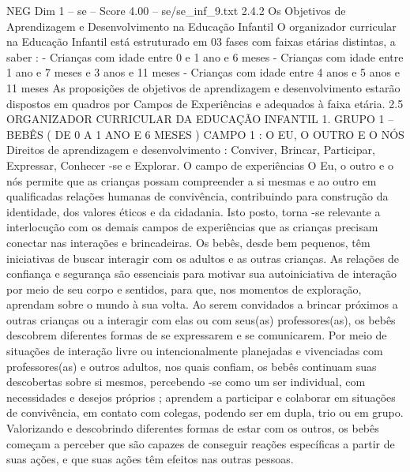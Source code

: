 \begin{textsample}{NEG Dim 1 – se – Score 4.00 – se/se\_inf\_9.txt}  \label{ex:f1_neg_202}
2.4.2 Os Objetivos de Aprendizagem e Desenvolvimento na Educação Infantil O organizador curricular na Educação Infantil está estruturado em 03 fases com faixas etárias distintas, a saber : - Crianças com idade entre 0 e 1 ano e 6 meses - Crianças com idade entre 1 ano e 7 meses e 3 anos e 11 meses - Crianças com idade entre 4 anos e 5 anos e 11 meses As proposições de objetivos de aprendizagem e desenvolvimento estarão dispostos em quadros por Campos de Experiências e adequados à faixa etária. 2.5 ORGANIZADOR CURRICULAR DA EDUCAÇÃO INFANTIL 1.
GRUPO 1 – BEBÊS ( DE 0 A 1 ANO E 6 MESES ) CAMPO 1 : O EU, O OUTRO E O NÓS Direitos de aprendizagem e desenvolvimento : Conviver, Brincar, Participar, Expressar, Conhecer -se e Explorar.
O campo de experiências O Eu, o outro e o nós permite que as crianças possam compreender a si mesmas e ao outro em qualificadas relações humanas de convivência, contribuindo para construção da identidade, dos valores éticos e da cidadania.
Isto posto, torna -se relevante a interlocução com os demais campos de experiências que as crianças precisam conectar nas interações e brincadeiras.
Os bebês, desde bem pequenos, têm iniciativas de buscar interagir com os adultos e as outras crianças.
As relações de confiança e segurança são essenciais para motivar sua autoiniciativa de interação por meio de seu corpo e sentidos, para que, nos momentos de exploração, aprendam sobre o mundo à sua volta.
Ao serem convidados a brincar próximos a outras crianças ou a interagir com elas ou com seus(as) professores(as), os bebês descobrem diferentes formas de se expressarem e se comunicarem.
Por meio de situações de interação livre ou intencionalmente planejadas e vivenciadas com professores(as) e outros adultos, nos quais confiam, os bebês continuam suas descobertas sobre si mesmos, percebendo -se como um ser individual, com necessidades e desejos próprios ; aprendem a participar e colaborar em situações de convivência, em contato com colegas, podendo ser em dupla, trio ou em grupo.
Valorizando e descobrindo diferentes formas de estar com os outros, os bebês começam a perceber que são capazes de conseguir reações específicas a partir de suas ações, e que suas ações têm efeitos nas outras pessoas.

\end{textsample}
